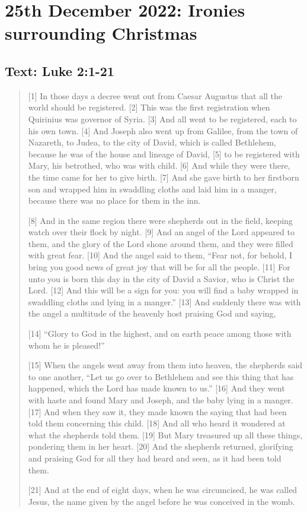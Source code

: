 \section{25th December 2022: Ironies surrounding Christmas}
\subsection*{Text: Luke 2:1-21}
  \begin{quote}
    [1] In those days a decree went out from Caesar Augustus that all the world should be registered. [2] This was the first registration when Quirinius was governor of Syria. [3] And all went to be registered, each to his own town. [4] And Joseph also went up from Galilee, from the town of Nazareth, to Judea, to the city of David, which is called Bethlehem, because he was of the house and lineage of David, [5] to be registered with Mary, his betrothed, who was with child. [6] And while they were there, the time came for her to give birth. [7] And she gave birth to her firstborn son and wrapped him in swaddling cloths and laid him in a manger, because there was no place for them in the inn.

    [8] And in the same region there were shepherds out in the field, keeping watch over their flock by night. [9] And an angel of the Lord appeared to them, and the glory of the Lord shone around them, and they were filled with great fear. [10] And the angel said to them, “Fear not, for behold, I bring you good news of great joy that will be for all the people. [11] For unto you is born this day in the city of David a Savior, who is Christ the Lord. [12] And this will be a sign for you: you will find a baby wrapped in swaddling cloths and lying in a manger.” [13] And suddenly there was with the angel a multitude of the heavenly host praising God and saying,

    [14] “Glory to God in the highest,
        and on earth peace among those with whom he is pleased!”


    [15] When the angels went away from them into heaven, the shepherds said to one another, “Let us go over to Bethlehem and see this thing that has happened, which the Lord has made known to us.” [16] And they went with haste and found Mary and Joseph, and the baby lying in a manger. [17] And when they saw it, they made known the saying that had been told them concerning this child. [18] And all who heard it wondered at what the shepherds told them. [19] But Mary treasured up all these things, pondering them in her heart. [20] And the shepherds returned, glorifying and praising God for all they had heard and seen, as it had been told them.

    [21] And at the end of eight days, when he was circumcised, he was called Jesus, the name given by the angel before he was conceived in the womb.
  \end{quote}
